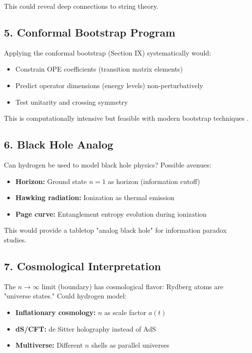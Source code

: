 \documentclass[aps,prd,twocolumn,superscriptaddress,floatfix]{revtex4-2}
\begin{document}
This could reveal deep connections to string theory.

\subsection{5. Conformal Bootstrap Program}

Applying the conformal bootstrap (Section IX) systematically would:
\begin{itemize}
\item Constrain OPE coefficients (transition matrix elements)
\item Predict operator dimensions (energy levels) non-perturbatively
\item Test unitarity and crossing symmetry
\end{itemize}

This is computationally intensive but feasible with modern bootstrap techniques \cite{poland2019}.

\subsection{6. Black Hole Analog}

Can hydrogen be used to model black hole physics? Possible avenues:
\begin{itemize}
\item \textbf{Horizon:} Ground state $n=1$ as horizon (information cutoff)
\item \textbf{Hawking radiation:} Ionization as thermal emission
\item \textbf{Page curve:} Entanglement entropy evolution during ionization
\end{itemize}

This would provide a tabletop "analog black hole" for information paradox studies.

\subsection{7. Cosmological Interpretation}

The $n \to \infty$ limit (boundary) has cosmological flavor: Rydberg atoms are "universe states." Could hydrogen model:
\begin{itemize}
\item \textbf{Inflationary cosmology:} $n$ as scale factor $a(t)$
\item \textbf{dS/CFT:} de Sitter holography instead of AdS
\item \textbf{Multiverse:} Different $n$ shells as parallel universes
\end{itemize}
\end{document}
